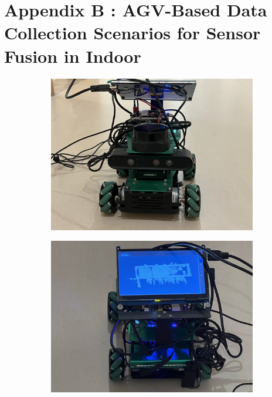 \documentclass[12pt,a4paper]{article}
\numberwithin{equation}{section}
\begin{document}
\section{Appendix B : AGV-Based Data Collection Scenarios for Sensor Fusion in Indoor}
\begin{figure}[H]
    \centering
    \begin{subfigure}[b]{0.5\textwidth}
        \centering
        \includegraphics[width=\textwidth]{images/test/1.jpg}
        \caption{}
    \end{subfigure} \hfill
    \begin{subfigure}[b]{0.5\textwidth}
        \centering
        \includegraphics[width=\textwidth]{images/test/2.jpg}
        \caption{}

\end{subfigure}
\end{figure}
\end{document}
